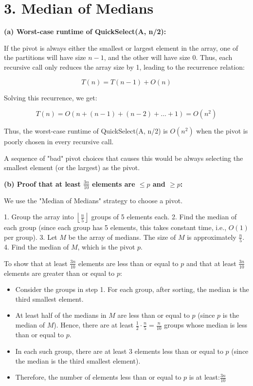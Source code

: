 \documentclass[11pt]{article}
\begin{document}
\newpage
\section*{3. Median of Medians}

\textbf{(a) Worst-case runtime of QuickSelect(A, n/2):}

If the pivot is always either the smallest or largest element in the array, one of the partitions will have size $n - 1$, and the other will have size 0. Thus, each recursive call only reduces the array size by 1, leading to the recurrence relation:

\[
T(n) = T(n-1) + O(n)
\]

Solving this recurrence, we get:

\[
T(n) = O(n + (n-1) + (n-2) + \dots + 1) = O(n^2)
\]

Thus, the worst-case runtime of QuickSelect(A, n/2) is $O(n^2)$ when the pivot is poorly chosen in every recursive call. 

A sequence of "bad" pivot choices that causes this would be always selecting the smallest element (or the largest) as the pivot.


\textbf{(b) Proof that at least $\frac{3n}{10}$ elements are $\leq p$ and $\geq p$:}

We use the "Median of Medians" strategy to choose a pivot. 

1. Group the array into $\left\lfloor \frac{n}{5} \right\rfloor$ groups of 5 elements each.
2. Find the median of each group (since each group has 5 elements, this takes constant time, i.e., $O(1)$ per group).
3. Let $M$ be the array of medians. The size of $M$ is approximately $\frac{n}{5}$.
4. Find the median of $M$, which is the pivot $p$.

To show that at least $\frac{3n}{10}$ elements are less than or equal to $p$ and that at least $\frac{3n}{10}$ elements are greater than or equal to $p$:

\begin{itemize}
    \item Consider the groups in step 1. For each group, after sorting, the median is the third smallest element.
    \item At least half of the medians in $M$ are less than or equal to $p$ (since $p$ is the median of $M$). Hence, there are at least $\frac{1}{2} \cdot \frac{n}{5} = \frac{n}{10}$ groups whose median is less than or equal to $p$.
    \item In each such group, there are at least 3 elements less than or equal to $p$ (since the median is the third smallest element).
    \item Therefore, the number of elements less than or equal to $p$ is at least:$\frac{3n}{10}$
\end{itemize}
\end{document}
